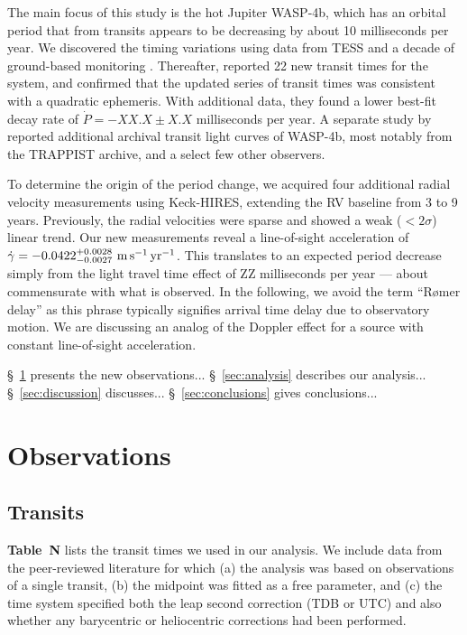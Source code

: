 \documentclass[12pt,twocolumn,tighten]{aastex62}
\begin{document}
The main focus of this study is the hot Jupiter WASP-4b, which has an
orbital period that from transits appears to be decreasing by about 10
milliseconds per year.  We discovered the timing variations using
data from TESS and a decade of ground-based monitoring
\citep[][hereafter ]{bouma_wasp4b_2019}.
Thereafter, \citet{southworth_transit_2019} reported 22 new transit
times for the system, and confirmed that the updated series of transit
times was consistent with a quadratic ephemeris.  With additional
data, they found a lower best-fit decay rate of $\dot{P} = -XX.X \pm
X.X$ milliseconds per year.
A separate study by \citet{baluev_2019} reported
additional archival transit light curves of WASP-4b, most notably from
the TRAPPIST archive, and a select few other observers.

To determine the origin of the period change, we acquired four
additional radial velocity measurements using Keck-HIRES, extending
the RV baseline from 3 to 9 years.  Previously, the radial velocities
were sparse and showed a weak ($<2\sigma$) linear trend.  Our new
measurements reveal a line-of-sight acceleration of $\dot{\gamma} =
-0.0422^{+0.0028}_{-0.0027}\ {\rm m\,s^{-1}\,yr^{-1}}$.  This
translates to an expected period
decrease simply from the light travel time effect of ZZ milliseconds
per year --- about commensurate with what is observed.
In the following, we avoid the term ``R{\o}mer delay'' as this phrase
typically signifies arrival time delay due to observatory motion. We
are discussing an analog of the Doppler effect for a source with
constant line-of-sight acceleration.


\S~\ref{sec:observations} presents the new observations...
\S~\ref{sec:analysis} describes our analysis...
\S~\ref{sec:discussion} discusses...
\S~\ref{sec:conclusions} gives conclusions...

\section{Observations}
\label{sec:observations}

\subsection{Transits}

{\bf Table~N} lists the transit times we used in our analysis.  We
include data from the peer-reviewed literature for which (a) the
analysis was based on observations of a single transit, (b) the
midpoint was fitted as a free parameter, and (c) the time system
specified both the leap second correction (TDB or UTC) and also
whether any barycentric or heliocentric corrections had been
performed.
\end{document}
